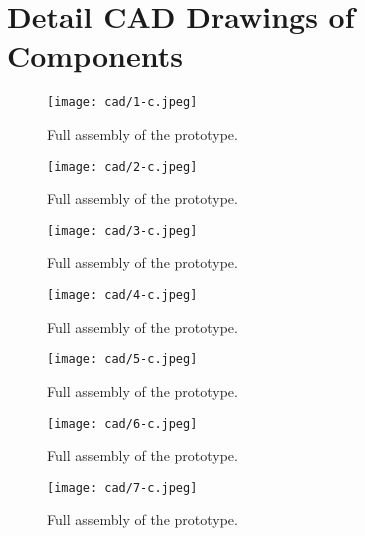 \documentclass[10pt]{article}
\begin{document}
\appendix

\section{Detail CAD Drawings of Components} \label{sec:appendixA}
\noindent

\begin{figure}[H] \centering
	\texttt{[image: cad/1-c.jpeg]}
	\caption{Full assembly of the prototype.}
	\label{fig:1-c}
\end{figure}


\begin{figure}[H] \centering
	\texttt{[image: cad/2-c.jpeg]}
	\caption{Full assembly of the prototype.}
	\label{fig:2-c}
\end{figure}


\begin{figure}[H] \centering
	\texttt{[image: cad/3-c.jpeg]}
	\caption{Full assembly of the prototype.}
	\label{fig:3-c}
\end{figure}


\begin{figure}[H] \centering
	\texttt{[image: cad/4-c.jpeg]}
	\caption{Full assembly of the prototype.}
	\label{fig:4-c}
\end{figure}


\begin{figure}[H] \centering
	\texttt{[image: cad/5-c.jpeg]}
	\caption{Full assembly of the prototype.}
	\label{fig:5-c}
\end{figure}


\begin{figure}[H] \centering
	\texttt{[image: cad/6-c.jpeg]}
	\caption{Full assembly of the prototype.}
	\label{fig:6-c}
\end{figure}


\begin{figure}[H] \centering
	\texttt{[image: cad/7-c.jpeg]}
	\caption{Full assembly of the prototype.}
	\label{fig:7-c}
\end{figure}
\end{document}
